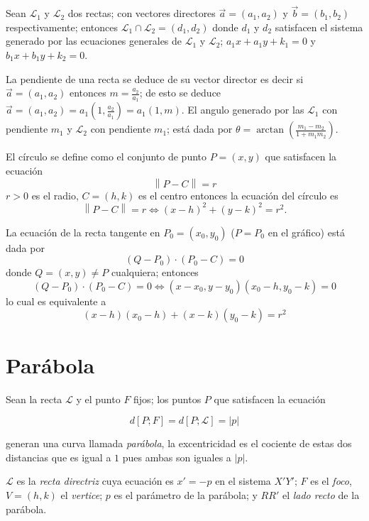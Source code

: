 \documentclass[10pt,]{krantz}
\theoremstyle{definition}
\theoremstyle{definition}
\theoremstyle{definition}
\theoremstyle{remark}
\begin{document}
Sean \(\mathcal{L}_1\) y \(\mathcal{L}_2\) dos rectas; con vectores directores \(\vec{a}=(a_1,a_2)\) y \(\vec{b}=(b_1,b_2)\) respectivamente; entonces \(\mathcal{L}_1\cap\mathcal{L}_2=(d_1,d_2)\) donde \(d_1\) y \(d_2\) satisfacen el sistema generado por las ecuaciones generales de \(\mathcal{L}_1\) y \(\mathcal{L}_2\); \(a_1x+a_1y+k_1=0\) y \(b_1x+b_1y+k_2=0\).

La pendiente de una recta se deduce de su vector director es decir si \(\vec{a}=(a_1,a_2)\) entonces \(m=\frac{a_2}{a_1}\); de esto se deduce \(\vec{a}=(a_1,a_2)=a_1(1,\frac{a_2}{a_1})=a_1(1,m)\). El angulo generado por las \(\mathcal{L}_1\) con pendiente \(m_1\) y \(\mathcal{L}_2\) con pendiente \(m_1\); está dada por \(\theta=\arctan\left(\frac{m_1-m_2}{1+m_1m_2}\right)\).

El círculo se define como el conjunto de punto \(P=(x,y)\) que satisfacen la ecuación \[\left \|P-C\right\|=r\] \(r>0\) es el radio, \(C=(h,k)\) es el centro entonces la ecuación del círculo es \[\left \|P-C\right\|=r\iff (x-h)^2+(y-k)^2=r^2.\]

La ecuación de la recta tangente en \(P_0=(x_0,y_0)\) (\(P=P_0\) en el gráfico) está dada por \[(Q-P_0)\cdot(P_0-C)=0\] donde \(Q=(x,y)\neq P\) cualquiera; entonces \[(Q-P_0)\cdot(P_0-C)=0\iff  (x-x_0,y-y_0)(x_0-h,y_0-k)=0\] lo cual es equivalente a \[(x-h)(x_0-h)+(x-k)(y_0-k)=r^2\]

\hypertarget{paruxe1bola}{%
\chapter{Parábola}\label{paruxe1bola}}

Sean la recta \(\mathcal{L}\) y el punto \(F\) fijos; los puntos \(P\) que satisfacen la ecuación

\begin{equation} 
d\left[P;F\right]=d\left[P;\mathcal{L}\right]=\left|p\right|\label{eq:www}
\end{equation}

generan una curva llamada \emph{parábola}, la excentricidad es el cociente de estas dos distancias que es igual a \(1\) pues ambas son iguales a \(\left|p\right|\).

\(\mathcal{L}\) es la \emph{recta directriz} cuya ecuación es \(x'=-p\) en el sistema \(X'Y'\); \(F\) es el \emph{foco}, \(V=(h,k)\) el \emph{vertice}; \(p\) es el parámetro de la parábola; y \(RR'\) el \emph{lado recto} de la parábola.
\end{document}

